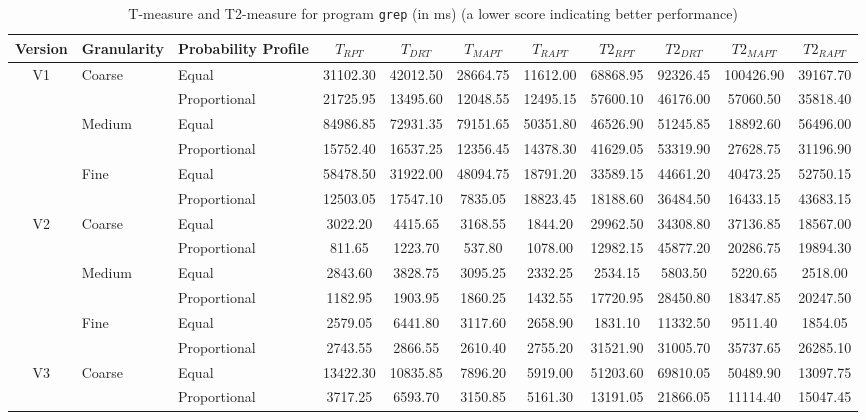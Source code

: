 \documentclass[10pt,journal,cspaper,compsoc,onecolumn]{IEEEtran}
\begin{document}
\begin{table}
\caption{T-measure and T2-measure for program \texttt{grep} (in ms) (a lower score indicating better performance)}
\label{tab:Tgrep}
\centering
\begin{tabular}{|c|l|l|c|c|c|c|c|c|c|c|} \hline
Version	& Granularity	& Probability Profile	& $T_{RPT}$	& $T_{DRT}$	& $T_{MAPT}$	& $T_{RAPT}$	& $T2_{RPT}$	& $T2_{DRT}$	& $T2_{MAPT}$	 & $T2_{RAPT}$	\\ \hline
V1	& Coarse	& Equal	& 31102.30	& 42012.50	& 28664.75	& 11612.00	& 68868.95	& 92326.45	& 100426.90	& 39167.70	 \\ \cline{3-11}
	& 	& Proportional	& 21725.95	& 13495.60	& 12048.55	& 12495.15	& 57600.10	& 46176.00	& 57060.50	& 35818.40	 \\ \cline{2-11}
	& Medium	& Equal	& 84986.85	& 72931.35	& 79151.65	& 50351.80	& 46526.90	& 51245.85	& 18892.60	& 56496.00	 \\ \cline{3-11}
	& 	& Proportional	& 15752.40	& 16537.25	& 12356.45	& 14378.30	& 41629.05	& 53319.90	& 27628.75	& 31196.90	 \\ \cline{2-11}
	& Fine	& Equal	& 58478.50	& 31922.00	& 48094.75	& 18791.20	& 33589.15	& 44661.20	& 40473.25	& 52750.15	 \\ \cline{3-11}
	& 	& Proportional	& 12503.05	& 17547.10	& 7835.05	& 18823.45	& 18188.60	& 36484.50	& 16433.15	& 43683.15	 \\ \hline
V2	& Coarse	& Equal	& 3022.20	& 4415.65	& 3168.55	& 1844.20	& 29962.50	& 34308.80	& 37136.85	& 18567.00	 \\ \cline{3-11}
	& 	& Proportional	& 811.65	& 1223.70	& 537.80	& 1078.00	& 12982.15	& 45877.20	& 20286.75	& 19894.30	 \\ \cline{2-11}
	& Medium	& Equal	& 2843.60	& 3828.75	& 3095.25	& 2332.25	& 2534.15	& 5803.50	& 5220.65	& 2518.00	 \\ \cline{3-11}
	& 	& Proportional	& 1182.95	& 1903.95	& 1860.25	& 1432.55	& 17720.95	& 28450.80	& 18347.85	& 20247.50	 \\ \cline{2-11}
	& Fine	& Equal	& 2579.05	& 6441.80	& 3117.60	& 2658.90	& 1831.10	& 11332.50	& 9511.40	& 1854.05	 \\ \cline{3-11}
	& 	& Proportional	& 2743.55	& 2866.55	& 2610.40	& 2755.20	& 31521.90	& 31005.70	& 35737.65	& 26285.10	 \\ \hline
V3	& Coarse	& Equal	& 13422.30	& 10835.85	& 7896.20	& 5919.00	& 51203.60	& 69810.05	& 50489.90	& 13097.75	 \\ \cline{3-11}
	& 	& Proportional	& 3717.25	& 6593.70	& 3150.85	& 5161.30	& 13191.05	& 21866.05	& 11114.40	& 15047.45	 \\ \cline{2-11}

\end{tabular}
\end{table}
\end{document}
